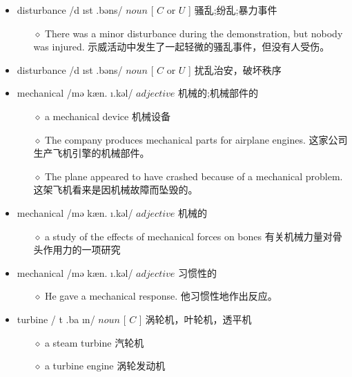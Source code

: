 \documentclass[a4paper,top=2.5cm,buttom=2.5cm10.5pt]{book}
\begin{document}
\begin{itemize}
\item disturbance /d \i  \textprimstress st \textrevepsilon  \textlengthmark .bəns/ $ noun $ [  $ C $  or  $ U $  ] 骚乱;纷乱;暴力事件
\begin{itemize}
\item[$\diamond$] There was a minor disturbance during the demonstration, but nobody was injured.
示威活动中发生了一起轻微的骚乱事件，但没有人受伤。
\end{itemize}
\end{itemize}
\begin{itemize}
\item disturbance /d \i  \textprimstress st \textrevepsilon  \textlengthmark .bəns/ $ noun $ [  $ C $  or  $ U $  ] 扰乱治安，破坏秩序
\end{itemize}
\begin{itemize}
\item mechanical /mə \textprimstress kæn. \i .kəl/ $ adjective $  机械的;机械部件的
\begin{itemize}
\item[$\diamond$] a mechanical device
机械设备
\item[$\diamond$] The company produces mechanical parts for airplane engines.
这家公司生产飞机引擎的机械部件。
\item[$\diamond$] The plane appeared to have crashed because of a mechanical problem.
这架飞机看来是因机械故障而坠毁的。
\end{itemize}
\end{itemize}
\begin{itemize}
\item mechanical /mə \textprimstress kæn. \i .kəl/ $ adjective $  机械的
\begin{itemize}
\item[$\diamond$] a study of the effects of mechanical forces on bones
有关机械力量对骨头作用力的一项研究
\end{itemize}
\end{itemize}
\begin{itemize}
\item mechanical /mə \textprimstress kæn. \i .kəl/ $ adjective $  习惯性的
\begin{itemize}
\item[$\diamond$] He gave a mechanical response.
他习惯性地作出反应。
\end{itemize}
\end{itemize}
\begin{itemize}
\item turbine / \textprimstress t \textrevepsilon  \textlengthmark .ba \i n/ $ noun $ [  $ C $  ] 涡轮机，叶轮机，透平机
\begin{itemize}
\item[$\diamond$] a steam turbine
汽轮机
\item[$\diamond$] a turbine engine
涡轮发动机
\end{itemize}
\end{itemize}
\end{document}
